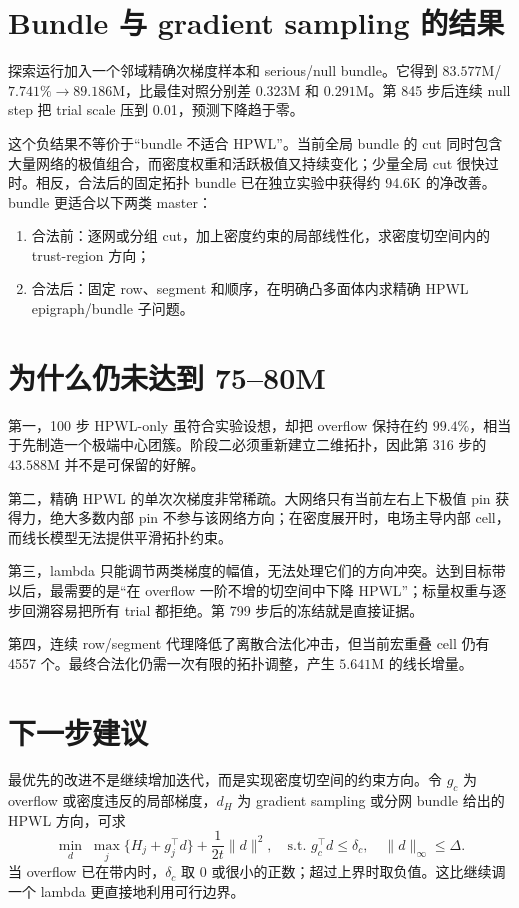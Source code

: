 \documentclass[11pt,a4paper]{ctexart}
\begin{document}
\section{Bundle 与 gradient sampling 的结果}

探索运行加入一个邻域精确次梯度样本和 serious/null bundle。它得到 $83.577$M/$7.741\%\rightarrow89.186$M，比最佳对照分别差 $0.323$M 和 $0.291$M。第 845 步后连续 null step 把 trial scale 压到 0.01，预测下降趋于零。

这个负结果不等价于“bundle 不适合 HPWL”。当前全局 bundle 的 cut 同时包含大量网络的极值组合，而密度权重和活跃极值又持续变化；少量全局 cut 很快过时。相反，合法后的固定拓扑 bundle 已在独立实验中获得约 94.6K 的净改善。bundle 更适合以下两类 master：
\begin{enumerate}[nosep]
\item 合法前：逐网或分组 cut，加上密度约束的局部线性化，求密度切空间内的 trust-region 方向；
\item 合法后：固定 row、segment 和顺序，在明确凸多面体内求精确 HPWL epigraph/bundle 子问题。
\end{enumerate}

\section{为什么仍未达到 75--80M}

第一，100 步 HPWL-only 虽符合实验设想，却把 overflow 保持在约 $99.4\%$，相当于先制造一个极端中心团簇。阶段二必须重新建立二维拓扑，因此第 316 步的 $43.588$M 并不是可保留的好解。

第二，精确 HPWL 的单次次梯度非常稀疏。大网络只有当前左右上下极值 pin 获得力，绝大多数内部 pin 不参与该网络方向；在密度展开时，电场主导内部 cell，而线长模型无法提供平滑拓扑约束。

第三，lambda 只能调节两类梯度的幅值，无法处理它们的方向冲突。达到目标带以后，最需要的是“在 overflow 一阶不增的切空间中下降 HPWL”；标量权重与逐步回溯容易把所有 trial 都拒绝。第 799 步后的冻结就是直接证据。

第四，连续 row/segment 代理降低了离散合法化冲击，但当前宏重叠 cell 仍有 4557 个。最终合法化仍需一次有限的拓扑调整，产生 $5.641$M 的线长增量。

\section{下一步建议}

最优先的改进不是继续增加迭代，而是实现密度切空间的约束方向。令 $g_c$ 为 overflow 或密度违反的局部梯度，$d_H$ 为 gradient sampling 或分网 bundle 给出的 HPWL 方向，可求
\begin{equation}
\min_d\;\max_j\{H_j+g_j^\top d\}+\frac{1}{2t}\|d\|^2,
\quad
\text{s.t. } g_c^\top d\leq \delta_c,
\quad \|d\|_\infty\leq\Delta.
\end{equation}
当 overflow 已在带内时，$\delta_c$ 取 0 或很小的正数；超过上界时取负值。这比继续调一个 lambda 更直接地利用可行边界。
\end{document}
